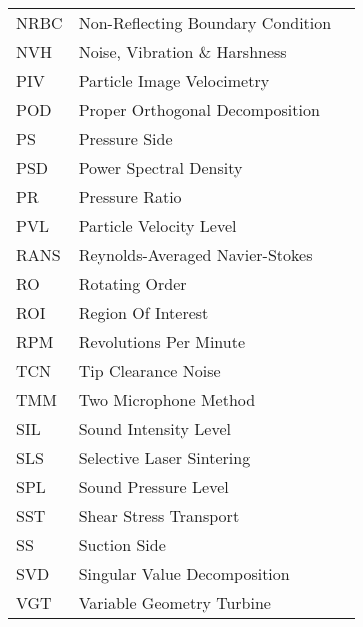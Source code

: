\begin{longtable}{lll}
NRBC & Non-Reflecting Boundary Condition \\
NVH & Noise, Vibration \& Harshness \\
PIV & Particle Image Velocimetry \\
POD & Proper Orthogonal Decomposition \\
PS & Pressure Side \\
PSD & Power Spectral Density \\
PR & Pressure Ratio \\
PVL & Particle Velocity Level \\
RANS & Reynolds-Averaged Navier-Stokes \\
RO & Rotating Order \\
ROI & Region Of Interest \\
RPM & Revolutions Per Minute \\
TCN & Tip Clearance Noise \\
TMM & Two Microphone Method \\
SIL & Sound Intensity Level \\
SLS & Selective Laser Sintering \\
SPL & Sound Pressure Level \\
SST & Shear Stress Transport \\
SS & Suction Side \\
SVD & Singular Value Decomposition \\
VGT & Variable Geometry Turbine \\
\end{longtable}

\normalsize